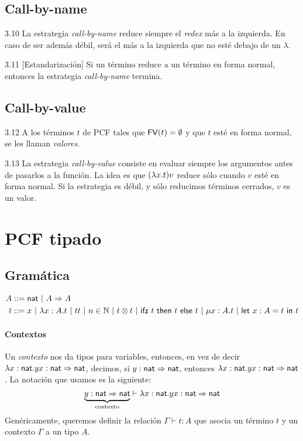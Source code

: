 \documentclass[twoside,a4paper,12pt]{article}
\theoremstyle{definition}
\theoremstyle{remark}
\begin{document}
\subsection*{Call-by-name}

\begin{definicion}{3.10}
  La estrategia \emph{call-by-name} reduce siempre el \emph{redex} más a la
  izquierda. En caso de ser además débil, será el más a la izquierda que no esté
  debajo de un $\lambda$.
\end{definicion}

\begin{teorema}{3.11}
  [Estandarización] Si un término reduce a un término en forma normal, entonces
  la estrategia \emph{call-by-name} termina.
\end{teorema}

\subsection*{Call-by-value}

\begin{definicion}{3.12}
  A los términos $t$ de PCF tales que $\mathsf{FV}(t)=\emptyset$ y que $t$ esté en forma
  normal, se les llaman \emph{valores}.
\end{definicion}

\begin{definicion}{3.13}
  La estrategia \emph{call-by-value} consiste en evaluar siempre los argumentos
  antes de pasarlos a la función. La idea es que $(\lambda {x}{.}{t})v$
  reduce sólo cuando $v$ esté en forma normal. Si la estrategia es débil, y sólo reducimos
  términos cerrados, $v$ es un valor.
\end{definicion}

\newpage
\section*{PCF tipado}

\subsection*{Gramática}

\begin{align*}
  A &::= \mathsf{nat}~|~A\Rightarrow A\\
  t &::= x~|~\lambda {x:A}{.}{t}~|~tt~|~n\in\mathbb N~|~t\otimes t~|~\mathsf{ifz~}t\mathsf{~then~}t\mathsf{~else~}t~|~\mathsf{\mu}x:A.t~|~\mathsf{let~}x:A=t\mathsf{~in~}t
\end{align*}

\paragraph{Contextos}
Un \emph{contexto} nos da tipos para variables, entonces,
en vez de decir $\lambda {x:\mathsf{nat}}{.}{yx}:\mathsf{nat}\Rightarrow\mathsf{nat}$, decimos, si
$y:\mathsf{nat}\Rightarrow\mathsf{nat}$, entonces $\lambda {x:\mathsf{nat}}{.}{yx}:\mathsf{nat}\Rightarrow\mathsf{nat}$. La
notación que usamos es la siguiente:
\[
  \underbrace{y:\mathsf{nat}\Rightarrow\mathsf{nat}}_{\textrm{contexto}}\vdash\lambda {x:\mathsf{nat}}{.}{yx}:\mathsf{nat}\Rightarrow\mathsf{nat}
\]
Genéricamente, queremos definir la relación $\Gamma\vdash t:A$ que asocia un
término $t$ y un contexto $\Gamma$ a un tipo $A$.
\end{document}
